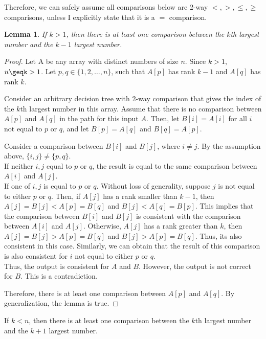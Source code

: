 \documentclass[10pt]{article}
\newtheorem{lemma}[theorem]{Lemma}
\begin{document}
\begin{enumerate}
	Therefore, we can safely assume all comparisons below are 2-way $<, >, \leq, \geq$ comparisons, 
	unless I explicitly state that it is a $=$ comparison.

	\begin{lemma}
	If $k > 1$, then there is at least one comparison between the $k$th largest number and the $k-1$ largest number.
	\end{lemma}
	
	\begin{proof}
	Let A be any array with distinct numbers of size $n$.
	Since $k>1$, $n\geqk>1$.
	Let $p, q \in \{1, 2, \ldots, n\}$, such that $A[p]$ has rank $k-1$ and $A[q]$ has rank $k$.

	Consider an arbitrary decision tree with 2-way comparison that gives the index of the $k$th largest
	number in this array.
	Assume that there is no comparison between $A[p]$ and $A[q]$ in the path for this input $A$.
	Then, let $B[i] = A[i]$ for all $i$ not equal to $p$ or $q$, and let $B[p] = A[q]$ and $B[q] = A[p]$.

	Consider a comparison between $B[i]$ and $B[j]$, where $i \neq j$.
	By the assumption above, $\{i, j\} \neq \{p, q\}$. \\
	If neither $i, j$ equal to $p$ or $q$, the result is equal to the same comparison between $A[i]$ and $A[j]$. \\
	If one of $i, j$ is equal to $p$ or $q$. 
	Without loss of generality, suppose $j$ is not equal to either $p$ or $q$. 
	Then, if $A[j]$ has a rank smaller than $k-1$, then $A[j] = B[j] < A[p] = B[q]$ and $B[j] < A[q] = B[p]$. 
	This implies that the comparison between $B[i]$ and $B[j]$ is consistent with the comparison between $A[i]$ and $A[j]$.
	Otherwise, $A[j]$ has a rank greater than $k$, then $A[j] = B[j] > A[p] = B[q]$ and $B[j] > A[p] = B[q]$. 
	Thus, its also consistent in this case.
	Similarly, we can obtain that the result of this comparison is also consistent for $i$ not equal to either $p$ or $q$. \\
	
	Thus, the output is consistent for $A$ and $B$.
	However, the output is not correct for $B$. 
	This is a contradiction.

	Therefore, there is at least one comparison between $A[p]$ and $A[q]$.
	By generalization, the lemma is true.
	\end{proof}

	\begin{corrolary}
	If $k < n$, then there is at least one comparison between the $k$th largest number and the $k+1$ largest number.
	\end{corrolary}


\end{enumerate}
\end{document}
